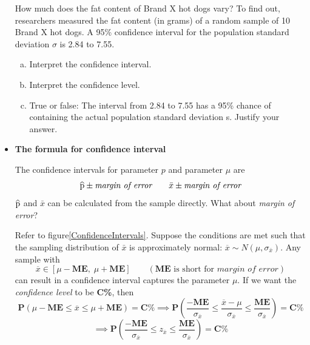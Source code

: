 \documentclass[a4paper, 12pt,twoside]{book}
\newcommand\reallywidehat[1]{%
\savestack{\tmpbox}{\stretchto{%
  \scaleto{%
    \scalerel*[\widthof{\ensuremath{#1}}]{\kern-.6pt\bigwedge\kern-.6pt}%
    {\rule[-\textheight/2]{1ex}{\textheight}}%
  }{\textheight}%
}{0.5ex}}%
\stackon[1pt]{#1}{\tmpbox}%
}
\begin{document}
\begin{itemize}
{{     How much does the fat content of Brand X hot dogs vary? To find out, researchers measured the fat content (in grams) of a random sample of 10 Brand X hot dogs. A 95\% confidence interval for the population standard deviation $\sigma$ is 2.84 to 7.55.
     \begin{enumerate}[(a)]
         \item Interpret the confidence interval.
         \item Interpret the confidence level.
         \item True or false: The interval from 2.84 to 7.55 has a 95\% chance of containing the actual population standard deviation s. Justify your answer.
     \end{enumerate}
     }}   

      
      
      
      
      
      
     \newpage 
      
      \item \textbf{The formula for confidence interval}\vspace{0.3cm}
      
      The confidence intervals for parameter $p$ and parameter $\mu$ are 
       $$\reallywidehat{p} \pm \textit{margin of error} \qquad \bar{x} \pm \textit{margin of error}$$
       $\reallywidehat{p}$ and $\bar{x}$ can be calculated from the sample directly. What about \textit{margin of error}? \vspace{0.6cm}     
       
       Refer to figure\ref{ConfidenceIntervals}. Suppose the conditions are met such that the sampling distribution of $\bar{x}$ is approximately normal: $\overline{x} \sim N(\mu, \sigma_{\bar{x}})$. Any sample with 
       $$\overline{x} \in [\mu - \textbf{ME},\; \mu + \textbf{ME}]\qquad(\textbf{ME} \text{ is short for} \textit{ margin of error})$$ 
       can result in a confidence interval captures the parameter $\mu$. If we want the \textit{confidence level} to be \textbf{C\%}, then
       $$\textbf{P}(\mu - \textbf{ME}\leq \overline{x} \leq \mu + \textbf{ME}) = \textbf{C\%} \implies \textbf{P}(\frac{-\textbf{ME}}{\sigma_{\overline{x}}}\leq \frac{\overline{x}-\mu}{\sigma_{\overline{x}}} \leq \frac{\textbf{ME}}{\sigma_{\overline{x}}}) = \textbf{C\%}$$
       $$\implies \textbf{P}(\frac{-\textbf{ME}}{\sigma_{\overline{x}}}\leq z_{\overline{x}} \leq \frac{\textbf{ME}}{\sigma_{\overline{x}}}) = \textbf{C\%}$$


\end{itemize}
\end{document}
